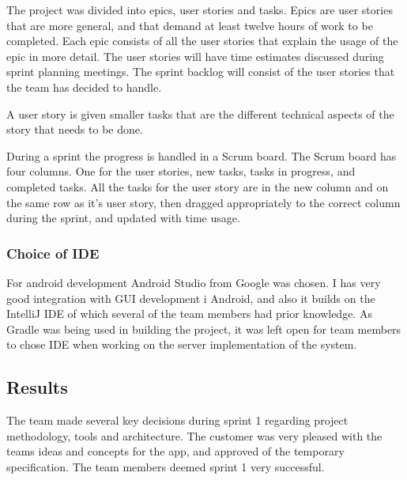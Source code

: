 The project was divided into epics, user stories and tasks. Epics are user stories that are more general, and that demand at least twelve hours of work to be completed. Each epic consists of all the user stories that explain the usage of the epic in more detail.
The user stories will have time estimates discussed during sprint planning meetings.
The sprint backlog will consist of the user stories that the team has decided to handle.

A user story is given smaller tasks that are the different technical aspects of the story that needs to be done.

During a sprint the progress is handled in a Scrum board. The Scrum board has four columns. One for the user stories, new tasks, tasks in progress, and completed tasks.
All the tasks for the user story are in the new column and on the same row as it's user story, then dragged appropriately to the correct column during the sprint, and updated with time usage.

\subsubsection{Choice of IDE}
For android development Android Studio from Google was chosen. I has very good integration with GUI development i Android, and also it builds on the IntelliJ IDE of which several of the team members had prior knowledge. As Gradle was being used in building the project, it was left open for team members to chose IDE when working on the server implementation of the system.

\subsection{Results}
The team made several key decisions during sprint 1 regarding project methodology, tools and architecture. The customer was very pleased with the teams ideas and concepts for the app, and approved of the temporary specification. The team members deemed sprint 1 very successful.
